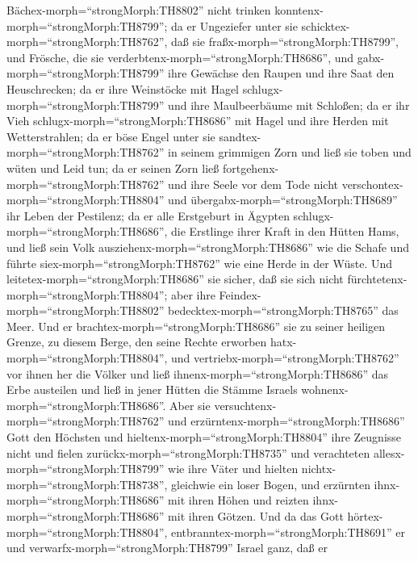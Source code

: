 Bächex-morph=``strongMorph:TH8802'' nicht trinken
konntenx-morph=``strongMorph:TH8799'';  da er Ungeziefer
unter sie schicktex-morph=``strongMorph:TH8762'', daß sie
fraßx-morph=``strongMorph:TH8799'', und Frösche, die sie
verderbtenx-morph=``strongMorph:TH8686'',  und
gabx-morph=``strongMorph:TH8799'' ihre Gewächse den Raupen und ihre Saat
den Heuschrecken;  da er ihre Weinstöcke mit Hagel
schlugx-morph=``strongMorph:TH8799'' und ihre Maulbeerbäume mit
Schloßen;  da er ihr Vieh
schlugx-morph=``strongMorph:TH8686'' mit Hagel und ihre Herden mit
Wetterstrahlen;  da er böse Engel unter sie
sandtex-morph=``strongMorph:TH8762'' in seinem grimmigen Zorn und ließ
sie toben und wüten und Leid tun;  da er seinen Zorn ließ
fortgehenx-morph=``strongMorph:TH8762'' und ihre Seele vor dem Tode
nicht verschontex-morph=``strongMorph:TH8804'' und
übergabx-morph=``strongMorph:TH8689'' ihr Leben der Pestilenz;
 da er alle Erstgeburt in Ägypten
schlugx-morph=``strongMorph:TH8686'', die Erstlinge ihrer Kraft in den
Hütten Hams,  und ließ sein Volk
ausziehenx-morph=``strongMorph:TH8686'' wie die Schafe und führte
siex-morph=``strongMorph:TH8762'' wie eine Herde in der Wüste.
 Und leitetex-morph=``strongMorph:TH8686'' sie sicher, daß
sie sich nicht fürchtetenx-morph=``strongMorph:TH8804''; aber ihre
Feindex-morph=``strongMorph:TH8802''
bedecktex-morph=``strongMorph:TH8765'' das Meer.  Und er
brachtex-morph=``strongMorph:TH8686'' sie zu seiner heiligen Grenze, zu
diesem Berge, den seine Rechte erworben
hatx-morph=``strongMorph:TH8804'',  und
vertriebx-morph=``strongMorph:TH8762'' vor ihnen her die Völker und ließ
ihnenx-morph=``strongMorph:TH8686'' das Erbe austeilen und ließ in jener
Hütten die Stämme Israels wohnenx-morph=``strongMorph:TH8686''.
 Aber sie versuchtenx-morph=``strongMorph:TH8762'' und
erzürntenx-morph=``strongMorph:TH8686'' Gott den Höchsten und
hieltenx-morph=``strongMorph:TH8804'' ihre Zeugnisse nicht 
und fielen zurückx-morph=``strongMorph:TH8735'' und verachteten
allesx-morph=``strongMorph:TH8799'' wie ihre Väter und hielten
nichtx-morph=``strongMorph:TH8738'', gleichwie ein loser Bogen,
 und erzürnten ihnx-morph=``strongMorph:TH8686'' mit ihren
Höhen und reizten ihnx-morph=``strongMorph:TH8686'' mit ihren Götzen.
 Und da das Gott hörtex-morph=``strongMorph:TH8804'',
entbranntex-morph=``strongMorph:TH8691'' er und
verwarfx-morph=``strongMorph:TH8799'' Israel ganz,  daß er
